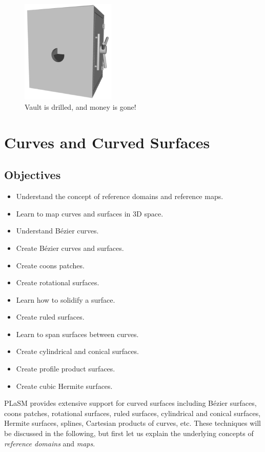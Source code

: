 \begin{figure}[!ht]
\begin{center}
\includegraphics[width=0.4\textwidth]{img/vault2.png}
\end{center}
\vspace{-4mm}
\caption{Vault is drilled, and money is gone!}
\label{fig:vault2}
\end{figure}
\noindent




\section{Curves and Curved Surfaces}\label{sec:curves}

\subsection{Objectives}
\begin{itemize}
\item Understand the concept of reference domains and reference maps.
\item Learn to map curves and surfaces in 3D space.
\item Understand B\'ezier curves.
\item Create B\'ezier curves and surfaces.
\item Create coons patches.
\item Create rotational surfaces.
\item Learn how to solidify a surface.
\item Create ruled surfaces.
\item Learn to span surfaces between curves.
\item Create cylindrical and conical surfaces.
\item Create profile product surfaces.
\item Create cubic Hermite surfaces.
\end{itemize}
PLaSM provides extensive support for curved surfaces including 
B\'ezier surfaces, coons patches, rotational surfaces, ruled surfaces,  
cylindrical and conical surfaces, Hermite surfaces, 
splines, Cartesian products of curves, etc. These techniques will be 
discussed in the following, but first let us explain the underlying 
concepts of {\em reference domains} and {\em maps}.

